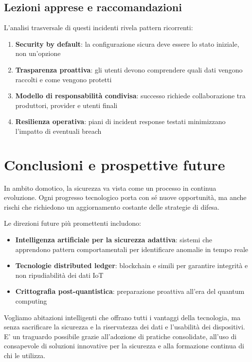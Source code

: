 \subsection{Lezioni apprese e raccomandazioni}

L'analisi trasversale di questi incidenti rivela pattern ricorrenti:

\begin{enumerate}
    \item \textbf{Security by default}: la configurazione sicura deve essere lo stato iniziale, non un'opzione
    \item \textbf{Trasparenza proattiva}: gli utenti devono comprendere quali dati vengono raccolti e come vengono protetti
    \item \textbf{Modello di responsabilità condivisa}: successo richiede collaborazione tra produttori, provider e utenti finali
    \item \textbf{Resilienza operativa}: piani di incident response testati minimizzano l'impatto di eventuali breach
\end{enumerate}

\section{Conclusioni e prospettive future}

In ambito domotico, la sicurezza va vista come un processo in continua evoluzione. Ogni progresso tecnologico porta con sé nuove opportunità, ma anche rischi che richiedono un aggiornamento costante delle strategie di difesa.

Le direzioni future più promettenti includono:

\begin{itemize}
    \item \textbf{Intelligenza artificiale per la sicurezza adattiva}: sistemi che apprendono pattern comportamentali per identificare anomalie in tempo reale
    \item \textbf{Tecnologie distributed ledger}: blockchain e simili per garantire integrità e non ripudiabilità dei dati IoT
    \item \textbf{Crittografia post-quantistica}: preparazione proattiva all'era del quantum computing
\end{itemize}

Vogliamo abitazioni intelligenti che offrano tutti i vantaggi della tecnologia, ma senza sacrificare la sicurezza e la riservatezza dei dati e l'usabilità dei dispositivi. E' un traguardo possibile grazie all'adozione di pratiche consolidate, all’uso di consapevole di soluzioni innovative per la sicurezza e alla formazione continua di chi le utilizza.